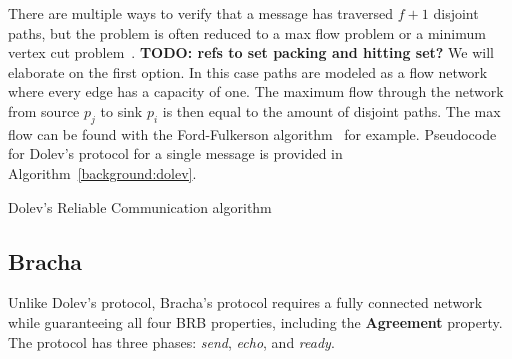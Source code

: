 There are multiple ways to verify that a message has traversed $f+1$ disjoint paths, but the problem is often reduced to a max flow problem or a minimum vertex cut problem~\cite{bonomi2019multihop}. \textbf{TODO: refs to set packing and hitting set?} We will elaborate on the first option. In this case paths are modeled as a flow network where every edge has a capacity of one. The maximum flow through the network from source $p_j$ to sink $p_i$ is then equal to the amount of disjoint paths. The max flow can be found with the Ford-Fulkerson algorithm~\cite{ford_fulkerson} for example. 
Pseudocode for Dolev's protocol for a single message is provided in Algorithm~\ref{background:dolev}.

\begin{algorithm}
  \DontPrintSemicolon
  
  
 \caption{Dolev's Reliable Communication algorithm}
 \label{background:dolev}
\end{algorithm}

\subsection*{Bracha}
Unlike Dolev's protocol, Bracha's protocol requires a fully connected network while guaranteeing all four BRB properties, including the \textbf{Agreement} property. 
The protocol has three phases: \textit{send}, \textit{echo}, and \textit{ready}.

